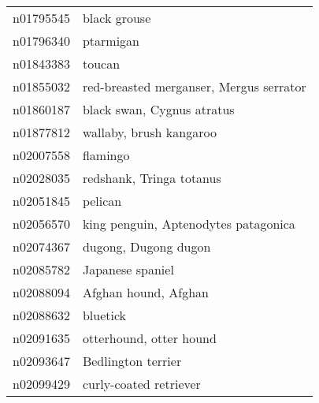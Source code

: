 \begin{appendices}
\begin{longtabu}{X|X[4]}
    		n01795545 &                                                                                                               black grouse \tabularnewline
    		n01796340 &                                                                                                                  ptarmigan \tabularnewline
    		n01843383 &                                                                                                                     toucan \tabularnewline
    		n01855032 &                                                                                    red-breasted merganser, Mergus serrator \tabularnewline
    		n01860187 &                                                                                                 black swan, Cygnus atratus \tabularnewline
    		n01877812 &                                                                                                    wallaby, brush kangaroo \tabularnewline
    		n02007558 &                                                                                                                   flamingo \tabularnewline
    		n02028035 &                                                                                                   redshank, Tringa totanus \tabularnewline
    		n02051845 &                                                                                                                    pelican \tabularnewline
    		n02056570 &                                                                                       king penguin, Aptenodytes patagonica \tabularnewline
    		n02074367 &                                                                                                       dugong, Dugong dugon \tabularnewline
    		n02085782 &                                                                                                           Japanese spaniel \tabularnewline
    		n02088094 &                                                                                                       Afghan hound, Afghan \tabularnewline
    		n02088632 &                                                                                                                   bluetick \tabularnewline
    		n02091635 &                                                                                                    otterhound, otter hound \tabularnewline
    		n02093647 &                                                                                                         Bedlington terrier \tabularnewline
    		n02099429 &                                                                                                     curly-coated retriever \tabularnewline

\end{longtabu}
\end{appendices}
